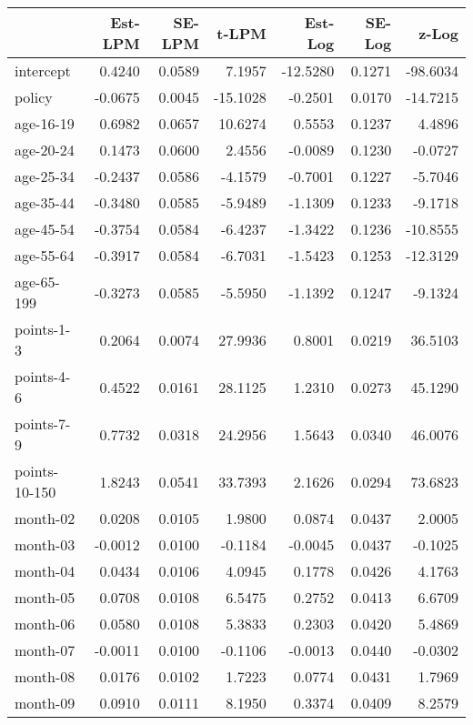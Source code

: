 \documentclass[10pt]{article}
\begin{document}
\begin{table}[ht]
\centering
\begin{tabular}{lrrrrrr}
  \hline
 & Est-LPM & SE-LPM & t-LPM & Est-Log & SE-Log & z-Log \\ 
  \hline
intercept & 0.4240 & 0.0589 & 7.1957 & -12.5280 & 0.1271 & -98.6034 \\ 
  policy & -0.0675 & 0.0045 & -15.1028 & -0.2501 & 0.0170 & -14.7215 \\ 
  age-16-19 & 0.6982 & 0.0657 & 10.6274 & 0.5553 & 0.1237 & 4.4896 \\ 
  age-20-24 & 0.1473 & 0.0600 & 2.4556 & -0.0089 & 0.1230 & -0.0727 \\ 
  age-25-34 & -0.2437 & 0.0586 & -4.1579 & -0.7001 & 0.1227 & -5.7046 \\ 
  age-35-44 & -0.3480 & 0.0585 & -5.9489 & -1.1309 & 0.1233 & -9.1718 \\ 
  age-45-54 & -0.3754 & 0.0584 & -6.4237 & -1.3422 & 0.1236 & -10.8555 \\ 
  age-55-64 & -0.3917 & 0.0584 & -6.7031 & -1.5423 & 0.1253 & -12.3129 \\ 
  age-65-199 & -0.3273 & 0.0585 & -5.5950 & -1.1392 & 0.1247 & -9.1324 \\ 
  points-1-3 & 0.2064 & 0.0074 & 27.9936 & 0.8001 & 0.0219 & 36.5103 \\ 
  points-4-6 & 0.4522 & 0.0161 & 28.1125 & 1.2310 & 0.0273 & 45.1290 \\ 
  points-7-9 & 0.7732 & 0.0318 & 24.2956 & 1.5643 & 0.0340 & 46.0076 \\ 
  points-10-150 & 1.8243 & 0.0541 & 33.7393 & 2.1626 & 0.0294 & 73.6823 \\ 
  month-02 & 0.0208 & 0.0105 & 1.9800 & 0.0874 & 0.0437 & 2.0005 \\ 
  month-03 & -0.0012 & 0.0100 & -0.1184 & -0.0045 & 0.0437 & -0.1025 \\ 
  month-04 & 0.0434 & 0.0106 & 4.0945 & 0.1778 & 0.0426 & 4.1763 \\ 
  month-05 & 0.0708 & 0.0108 & 6.5475 & 0.2752 & 0.0413 & 6.6709 \\ 
  month-06 & 0.0580 & 0.0108 & 5.3833 & 0.2303 & 0.0420 & 5.4869 \\ 
  month-07 & -0.0011 & 0.0100 & -0.1106 & -0.0013 & 0.0440 & -0.0302 \\ 
  month-08 & 0.0176 & 0.0102 & 1.7223 & 0.0774 & 0.0431 & 1.7969 \\ 
  month-09 & 0.0910 & 0.0111 & 8.1950 & 0.3374 & 0.0409 & 8.2579 \\ 

\end{tabular}
\end{table}
\end{document}
